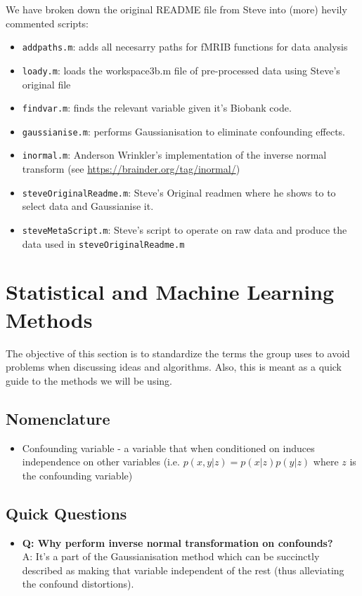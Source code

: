 \documentclass{article}
\begin{document}
We have broken down the original README file from Steve into (more) hevily commented scripts:
\begin{itemize}
\item {\tt addpaths.m}: adds all necesarry paths for fMRIB functions for data analysis
\item {\tt loady.m}: loads the workspace3b.m file of pre-processed data using Steve's original file
\item {\tt findvar.m}: finds the relevant variable given it's Biobank code.
\item {\tt gaussianise.m}: performs Gaussianisation to eliminate confounding effects.
\item {\tt inormal.m}: Anderson Wrinkler's implementation of the inverse normal transform (see \url{https://brainder.org/tag/inormal/})
\item {\tt steveOriginalReadme.m}: Steve's Original readmen where he shows to to select data and Gaussianise it.
\item {\tt steveMetaScript.m}: Steve's script to operate on raw data and produce the data used in {\tt steveOriginalReadme.m}
\end{itemize}

\section{Statistical and Machine Learning Methods\label{sec:methods}}

The objective of this section is to standardize the terms the group uses to avoid problems when discussing ideas and algorithms. Also, this is meant as a quick guide to the methods we will be using.

\subsection{Nomenclature\label{sec:method-nomen}}
\begin{itemize}
\item Confounding variable - a variable that when conditioned on induces independence on other variables (i.e. $p(x,y|z) = p(x|z)p(y|z)$ where $z$ is the confounding variable)
\end{itemize}


\subsection{Quick Questions}
\begin{itemize}
\item {\bf Q: Why perform inverse normal transformation on confounds?} \\
  A: It's a part of the Gaussianisation \cite{Chen2001} method which can be succinctly described as making that variable independent of the rest (thus alleviating the confound distortions).
\end{itemize}
\end{document}

